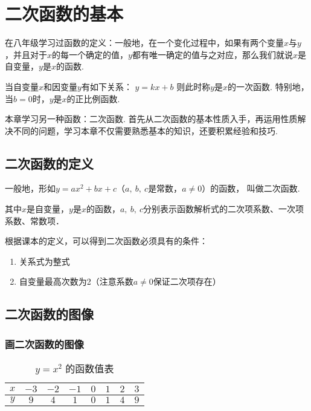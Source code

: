 \section{二次函数的基本}

在八年级学习过函数的定义：一般地，在一个变化过程中，如果有两个变量\(x\)与\(y\)，并且对于\(x\)的每一个确定的值，\(y\)都有唯一确定的值与之对应，那么我们就说\(x\)是自变量，\(y\)是\(x\)的函数.
\par
当自变量\(x\)和因变量\(y\)有如下关系：
\(y=kx+b\)
则此时称\(y\)是\(x\)的一次函数. 特别地，当\(b=0\)时，\(y\)是\(x\)的正比例函数.
\par
本章学习另一种函数：二次函数. 首先从二次函数的基本性质入手，再运用性质解决不同的问题，学习本章不仅需要熟悉基本的知识，还要积累经验和技巧.


\subsection{二次函数的定义}

\begin{definition}
一般地，形如\(y=ax^2+bx+c\)（\(a,\ b,\ c\)是常数，\(a\ne0\)）的函数， 叫做二次函数.
\par
其中\(x\)是自变量，\(y\)是\(x\)的函数，\(a,\ b,\ c\)分别表示函数解析式的二次项系数、一次项系数、常数项．
\end{definition}

根据课本的定义，可以得到二次函数必须具有的条件：
\begin{enumerate}
    \item 关系式为整式
    \item 自变量最高次数为2（注意系数\(a\ne0\)保证二次项存在）
\end{enumerate}

\subsection{二次函数的图像}

\subsubsection{画二次函数的图像}
\begin{table}[h]
\centering
\renewcommand{\arraystretch}{1.2} %
\begin{tabular}{|c|*{7}{c|}} \hline
\( x \) & \(-3\) & \(-2\) & \(-1\) & \(0\) & \(1\) & \(2\) & \(3\) \\ \hline\hline
\( y \) & \(9\) & \(4\) & \(1\) & \(0\) & \(1\) & \(4\) & \(9\) \\ \hline
\end{tabular}
\caption{\( y = x^2 \) 的函数值表}
\end{table}

